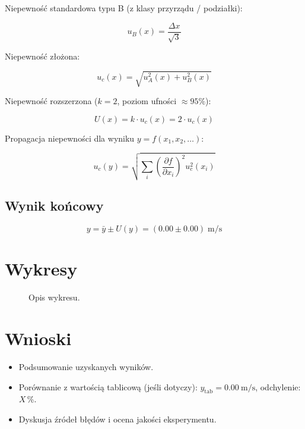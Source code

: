 \documentclass[12pt, a4paper]{article}
\begin{document}
Niepewność standardowa typu B (z klasy przyrządu / podziałki):

\begin{equation}
    u_B(x) = \frac{\Delta x}{\sqrt{3}}
\end{equation}

Niepewność złożona:

\begin{equation}
    u_c(x) = \sqrt{u_A^2(x) + u_B^2(x)}
\end{equation}

Niepewność rozszerzona ($k = 2$, poziom ufności $\approx 95\%$):

\begin{equation}
    U(x) = k \cdot u_c(x) = 2 \cdot u_c(x)
\end{equation}

Propagacja niepewności dla wyniku $y = f(x_1, x_2, \ldots)$:

\begin{equation}
    u_c(y) = \sqrt{\sum_{i} \left(\frac{\partial f}{\partial x_i}\right)^2 u_c^2(x_i)}
\end{equation}

\subsection{Wynik końcowy}

\begin{equation}
    y = \bar{y} \pm U(y) = (\num{0.00} \pm \num{0.00}) \; \si{\meter\per\second}
\end{equation}

\section{Wykresy}

\begin{figure}[H]
    \centering
    \caption{Opis wykresu.}
    \label{fig:wykres}
\end{figure}

\section{Wnioski}

\begin{itemize}
    \item Podsumowanie uzyskanych wyników.
    \item Porównanie z wartością tablicową (jeśli dotyczy): $y_\text{tab} = \SI{0.00}{\meter\per\second}$, odchylenie: $X$\,\%.
    \item Dyskusja źródeł błędów i ocena jakości eksperymentu.
\end{itemize}

\end{document}
